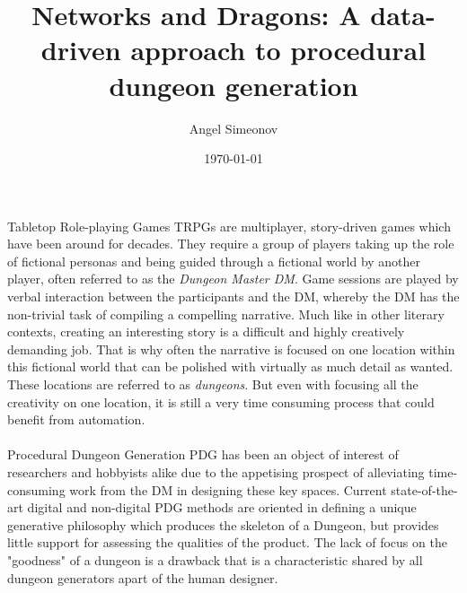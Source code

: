 \documentclass{UoYCSproject}
\author{Angel Simeonov}
\title{Networks and Dragons: A data-driven approach to procedural dungeon generation}
\date{\today}
\begin{document}
\maketitle
\listoffigures
\listoftables

\begin{summary}



\paragraph{}
Tabletop Role-playing Games TRPGs are multiplayer, story-driven games which have been around for decades. They require a group of players taking up the role of fictional personas and being guided through a fictional world by another player, often referred to as the \textit{Dungeon Master DM}. Game sessions are played by verbal interaction between the participants and the DM, whereby the DM has the non-trivial task of compiling a compelling narrative. Much like in other literary contexts, creating an interesting story is a difficult and highly creatively demanding job. That is why often the narrative is focused on one location within this fictional world that can be polished with virtually as much detail as wanted. These locations are referred to as \textit{dungeons}. But even with focusing all the creativity on one location, it is still a very time consuming process that could benefit from automation.

\paragraph{}
Procedural Dungeon Generation PDG has been an object of interest of researchers and hobbyists alike due to the appetising prospect of alleviating time-consuming work from the DM in designing these key spaces. Current state-of-the-art digital and non-digital PDG methods are oriented in defining a unique generative philosophy which produces the skeleton of a Dungeon, but provides little support for assessing the qualities of the product. The lack of focus on the "goodness" of a dungeon is a drawback that is a characteristic shared by all dungeon generators apart of the human designer.


\end{summary}
\end{document}

